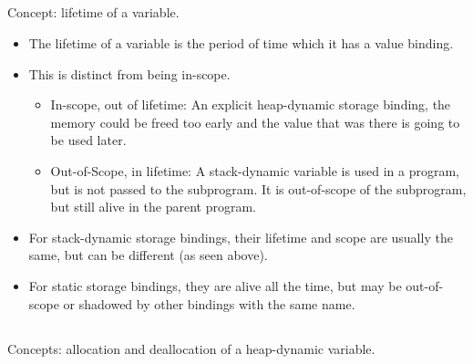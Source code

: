 \subsection{}
Concept: lifetime of a variable.

\begin{itemize}
\item The lifetime of a variable is the period of time which it has a value binding.
\item This is distinct from being in-scope.
  \begin{itemize}[noitemsep]
  \item In-scope, out of lifetime: An explicit heap-dynamic storage binding, the memory could be freed too early and the value that was there is going to be used later.
  \item Out-of-Scope, in lifetime: A stack-dynamic variable is used in a program, but is not passed to the subprogram. It is out-of-scope of the subprogram, but still alive in the parent program.
  \end{itemize}
\item For stack-dynamic storage bindings, their lifetime and scope are usually the same, but can be different (as seen above).
\item For static storage bindings, they are alive all the time, but may be out-of-scope or shadowed by other bindings with the same name.
\end{itemize}

\subsection{}
Concepts: allocation and deallocation of a heap-dynamic variable.

